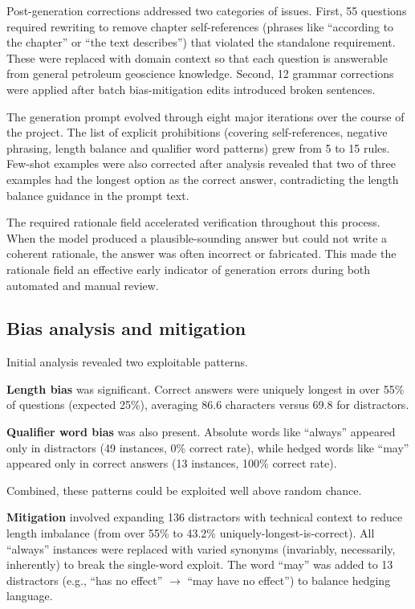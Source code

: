 \documentclass[11pt]{article}
\begin{document}
Post-generation corrections addressed two categories of issues. First, 55 questions required rewriting to remove chapter self-references (phrases like ``according to the chapter'' or ``the text describes'') that violated the standalone requirement. These were replaced with domain context so that each question is answerable from general petroleum geoscience knowledge. Second, 12 grammar corrections were applied after batch bias-mitigation edits introduced broken sentences.

The generation prompt evolved through eight major iterations over the course of the project. The list of explicit prohibitions (covering self-references, negative phrasing, length balance and qualifier word patterns) grew from 5 to 15 rules. Few-shot examples were also corrected after analysis revealed that two of three examples had the longest option as the correct answer, contradicting the length balance guidance in the prompt text.

The required rationale field accelerated verification throughout this process. When the model produced a plausible-sounding answer but could not write a coherent rationale, the answer was often incorrect or fabricated. This made the rationale field an effective early indicator of generation errors during both automated and manual review.


\subsection{Bias analysis and mitigation}

Initial analysis revealed two exploitable patterns.

\textbf{Length bias} was significant. Correct answers were uniquely longest in over 55\% of questions (expected 25\%), averaging 86.6 characters versus 69.8 for distractors.

\textbf{Qualifier word bias} was also present. Absolute words like ``always'' appeared only in distractors (49 instances, 0\% correct rate), while hedged words like ``may'' appeared only in correct answers (13 instances, 100\% correct rate).

Combined, these patterns could be exploited well above random chance.

\textbf{Mitigation} involved expanding 136 distractors with technical context to reduce length imbalance (from over 55\% to 43.2\% uniquely-longest-is-correct). All ``always'' instances were replaced with varied synonyms (invariably, necessarily, inherently) to break the single-word exploit. The word ``may'' was added to 13 distractors (e.g., ``has no effect'' $\to$ ``may have no effect'') to balance hedging language.
\end{document}
